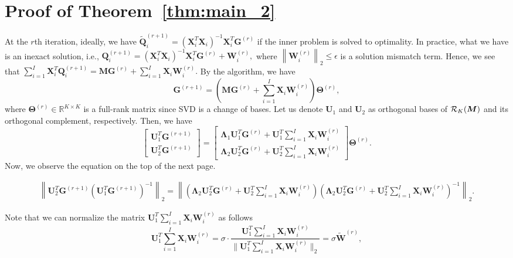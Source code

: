 \documentclass[10pt,journal]{IEEEtran}
\newcommand{\G}{\boldsymbol{G}}
\newcommand{\Q}{\boldsymbol{Q}}
\newcommand{\X}{\boldsymbol{X}}
\newcommand{\U}{\boldsymbol{U}}
\newcommand{\M}{\boldsymbol{M}}
\begin{document}
\section{Proof of Theorem~\ref{thm:main_2}}
At the $r$th iteration, ideally, we have
${\tilde{\bm Q}_i^{(r+1)}}= ({\bm X}_i^T{\bm X}_i)^{-1}{\bm X}_i^T{\bm G}^{(r)}$
if the inner problem is solved to optimality.
In practice, what we have is an inexact solution, i.e.,
${\Q}_i^{(r+1)}= ({\bm X}_i^T{\bm X}_i)^{-1}{\bm X}_i^T{\bm G}^{(r)} + {\bm W}_i^{(r)},$
where $\left\|{\bm W}_i^{(r)}\right\|_2\leq\epsilon$ is a solution mismatch term.
Hence, we see that
$\sum_{i=1}^I{\bm X}_i^T\Q_i^{(r+1)} = \M\G^{(r)} + \sum_{i=1}^I \X_i{\bm W}_i^{(r)}.$
By the algorithm, we have
\[\G^{(r+1)} =   \left(\M\G^{(r)} + \sum_{i=1}^I \X_i{\bm W}_i^{(r)}\right) {\bm \Theta}^{(r)},\]
where ${\bm \Theta}^{(r)}\in\mathbb{R}^{K\times K}$ is a full-rank matrix since SVD is a change of  bases.
Let us denote $\bm U_1$ and $\bm U_2$ as orthogonal bases of ${\cal R}_K(\M)$ and its orthogonal complement, respectively.
Then, we have
\begin{equation}
\begin{bmatrix}
\U_1^T\G^{(r+1)}\\ \U_2^T\G^{(r+1)}
\end{bmatrix}
=
\begin{bmatrix}
\bm \Lambda_1 \U_1^T\G^{(r)} + \U_1^T  \sum_{i=1}^I \X_i{\bm W}_i^{(r)} \\ \bm \Lambda_2 \U_2^T\G^{(r)} + \U_2^T  \sum_{i=1}^I \X_i{\bm W}_i^{(r)}
\end{bmatrix}
{\bm \Theta}^{(r)}.
\end{equation}
Now, we observe the equation on the top of the next page.
\begin{figure}[t]
\begin{align}
\left\| \U_2^T\G^{(r+1)}\left( \U_1^T\G^{(r+1)} \right)^{-1}  \right\|_2 = \left\|\left(\bm \Lambda_2 \U_2^T\G^{(r)} + \U_2^T  \sum_{i=1}^I \X_i{\bm W}_i^{(r)} \right)\left(\bm \Lambda_2 \U_2^T\G^{(r)} + \U_2^T  \sum_{i=1}^I \X_i{\bm W}_i^{(r)}  \right)^{-1}\right\|_2.
\end{align}
\hrulefill
\end{figure}
Note that we can normalize the matrix $\U_1^T  \sum_{i=1}^I \X_i{\bm W}_i^{(r)}$ as follows
\begin{equation}
   \U_1^T\sum_{i=1}^I \X_i{\bm W}_i^{(r)} = \sigma\cdot  \frac{\U_1^T  \sum_{i=1}^I \X_i{\bm W}_i^{(r)}}{\|\U_1^T \sum_{i=1}^I \X_i{\bm W}_i^{(r)}\|_2}=\sigma\tilde{\bm W}^{(r)},    
\end{equation}
\end{document}
